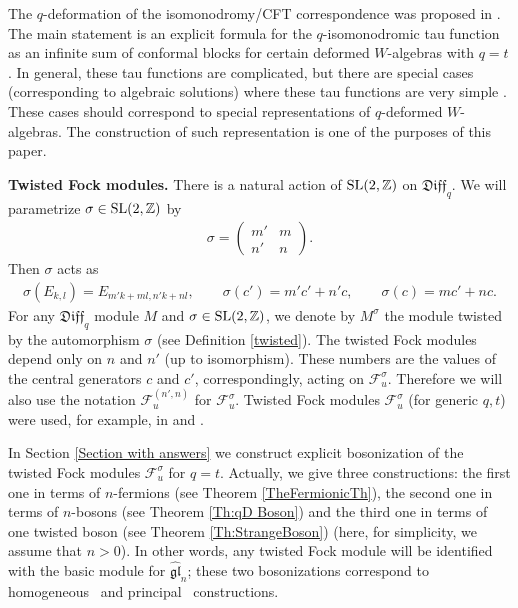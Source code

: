 \documentclass[pdftex]{sigma}
\numberwithin{equation}{section}
\theoremstyle{definition}
\newcommand{\qD}{\mathfrak{Diff}_q}
\begin{document}
The $q$-deformation of the isomonodromy/CFT correspondence was proposed in \cite{BS:2016:1,BGT17,JNS17}. The main statement is an explicit formula for the $q$-isomonodromic tau function as an infinite sum of conformal blocks for certain deformed $W$-algebras with $q=t$. In general, these tau functions are complicated, but there are special cases (corresponding to algebraic solutions) where these tau functions are very simple \cite{BGM, BS:2016:1}. These cases should correspond to special representations of $q$-deformed $W$-algebras. The construction of such representation is one of the purposes of this paper.

{\bf Twisted Fock modules.}
There is a natural action of ${\rm SL}(2,\mathbb{Z})$ on $\qD$. We will parametrize $\sigma\in {\rm SL}(2,\mathbb{Z})$ by
\begin{gather*}%
\sigma = \begin{pmatrix}
m' & m \\
n' & n
\end{pmatrix}.
\end{gather*}
Then $\sigma$ acts as
\begin{gather*}
\sigma( E_{k,l} ) = E_{ m' k + m l, n' k + n l },\qquad
\sigma (c') = m' c' + n' c,\qquad
\sigma (c) = m c' + n c.
\end{gather*}
For any $\qD$ module $M$ and $\sigma \in {\rm SL}(2,\mathbb{Z})$, we denote by $M^\sigma$ the module twisted by the automorphism $\sigma$ (see Definition \ref{twisted}). The twisted Fock modules depend only on $n$ and $n'$ (up to isomorphism). These numbers are the values of the central generators $c$ and $c'$, correspondingly, acting on $\mathcal{F}_u^\sigma$. Therefore we will also use the notation $\mathcal{F}_u^{(n',n)}$ for $\mathcal{F}_u^\sigma$. Twisted Fock modules $\mathcal{F}_u^\sigma$ (for generic $q, t$) were used, for example, in \cite{AFS} and \cite{GN15}.

In Section \ref{Section with answers} we construct explicit bosonization of the twisted Fock modules $\mathcal{F}_u^\sigma$ for $q=t$. Actually, we give three constructions: the first one in terms of $n$-fermions (see Theorem \ref{TheFermionicTh}), the second one in terms of $n$-bosons (see Theorem \ref{Th:qD Boson}) and the third one in terms of one twisted boson (see Theorem \ref{Th:StrangeBoson}) (here, for simplicity, we assume that $n>0$). In other words, any twisted Fock module will be identified with the basic module for $\widehat{\mathfrak{gl}}_n$; these two bosonizations correspond to homogeneous~\cite{FK} and principal~\cite{KKLW,LW} constructions.
\end{document}
